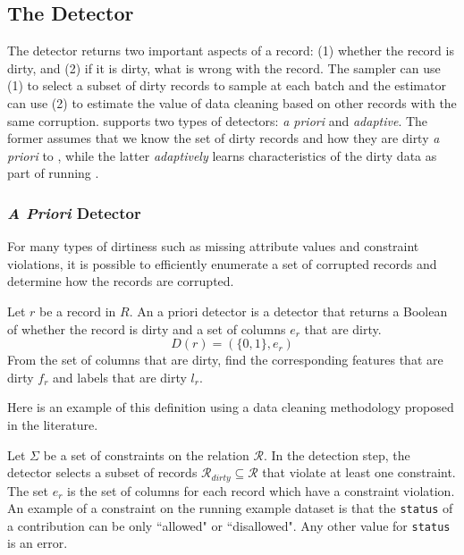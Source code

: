 \subsection{The Detector}\label{det}

The detector returns two important aspects of a record: 
(1) whether the record is dirty, and (2) if it is dirty, what is wrong with the record.
The sampler can use (1) to select a subset of dirty records to sample at each batch and 
the estimator can use (2) to estimate the value of data cleaning based on other records with the same corruption.
\sys supports two types of detectors: \emph{a priori} and \emph{adaptive}.
The former assumes that we know the set of dirty records and how they are dirty \emph{a priori} to \sys,
while the latter \emph{adaptively} learns characteristics of the dirty data as part of running \sys.

\subsubsection{\protect\textit{\large A Priori} Detector}
For many types of dirtiness such as missing attribute values and constraint violations, 
it is possible to efficiently enumerate a set of corrupted records and determine how the records are corrupted.

\begin{definition}
Let $r$ be a record in $R$. An a priori detector is a detector that returns a Boolean of whether the record is dirty and a set of columns $e_r$ that are dirty.
\[
D(r) = (\{0,1\}, e_r)
\]
From the set of columns that are dirty, find the corresponding features that are dirty $f_r$ and labels that are dirty $l_r$.
\end{definition}

\noindent Here is an example of this definition using a data cleaning methodology proposed in the literature.

\vspace{0.5em}

\begin{example}\label{detex1}
Let $\Sigma$ be a set of constraints on the relation $\mathcal{R}$. 
In the detection step, the detector selects a subset of records $\mathcal{R}_{dirty} \subseteq \mathcal{R}$ that violate at least one constraint. The set $e_r$ is the set of columns for each record which have a constraint violation.
An example of a constraint on the running example dataset is that the \texttt{status} of
a contribution can be only ``allowed" or ``disallowed".
Any other value for \texttt{status} is an error.
\end{example}


